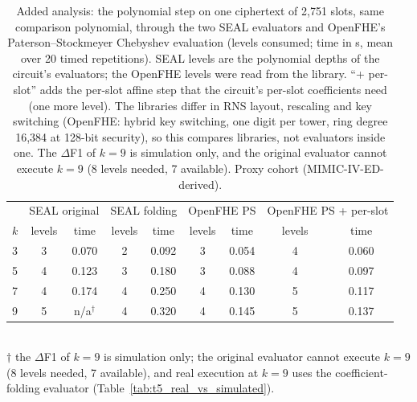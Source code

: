 \begin{table}[t]
\centering
\caption{Added analysis: the polynomial step on one ciphertext of 2,751 slots, same comparison polynomial, through the two SEAL evaluators and OpenFHE's Paterson--Stockmeyer Chebyshev evaluation (levels consumed; time in s, mean over 20 timed repetitions). SEAL levels are the polynomial depths of the circuit's evaluators; the OpenFHE levels were read from the library. ``+ per-slot'' adds the per-slot affine step that the circuit's per-slot coefficients need (one more level). The libraries differ in RNS layout, rescaling and key switching (OpenFHE: hybrid key switching, one digit per tower, ring degree 16,384 at 128-bit security), so this compares libraries, not evaluators inside one. The $\Delta$F1 of $k=9$ is simulation only, and the original evaluator cannot execute $k=9$ (8 levels needed, 7 available). Proxy cohort (MIMIC-IV-ED-derived).}
\label{tab:s6_ps_benchmark}
\begin{tabular}{lcccccccc}
\toprule
& \multicolumn{2}{c}{SEAL original} & \multicolumn{2}{c}{SEAL folding} & \multicolumn{2}{c}{OpenFHE PS} & \multicolumn{2}{c}{OpenFHE PS + per-slot} \\
$k$ & levels & time & levels & time & levels & time & levels & time \\
\midrule
3 & 3 & 0.070 & 2 & 0.092 & 3 & 0.054 & 4 & 0.060 \\
5 & 4 & 0.123 & 3 & 0.180 & 3 & 0.088 & 4 & 0.097 \\
7 & 4 & 0.174 & 4 & 0.250 & 4 & 0.130 & 5 & 0.117 \\
9 & 5 & n/a$^\dagger$ & 4 & 0.320 & 4 & 0.145 & 5 & 0.137 \\
\bottomrule
\end{tabular}
\\[2pt]
{\footnotesize $\dagger$ the $\Delta$F1 of $k=9$ is simulation only; the original evaluator cannot execute $k=9$ (8 levels needed, 7 available), and real execution at $k=9$ uses the coefficient-folding evaluator (Table~\ref{tab:t5_real_vs_simulated}).}
\end{table}
